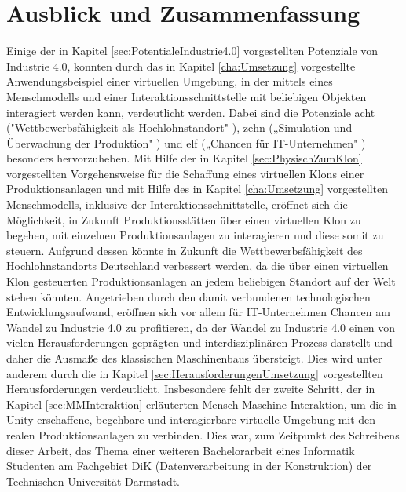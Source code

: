 \chapter{Ausblick und Zusammenfassung}\label{cha:AusblickUndFazit}

Einige der in Kapitel \ref{sec:PotentialeIndustrie4.0} vorgestellten Potenziale von Industrie 4.0, konnten durch das in Kapitel \ref{cha:Umsetzung} vorgestellte Anwendungsbeispiel einer virtuellen Umgebung, in der mittels eines Menschmodells und einer Interaktionsschnittstelle mit beliebigen Objekten interagiert werden kann, verdeutlicht werden. Dabei sind die Potenziale acht ("Wettbewerbsfähigkeit als Hochlohnstandort" \cite[S.20]{12}), zehn („Simulation und Überwachung der Produktion" \cite{6}) und elf („Chancen für IT-Unternehmen" \cite[S.7]{2}) besonders hervorzuheben.
\newline
Mit Hilfe der in Kapitel \ref{sec:PhysischZumKlon} vorgestellten Vorgehensweise für die Schaffung eines virtuellen Klons einer Produktionsanlagen und mit Hilfe des in Kapitel \ref{cha:Umsetzung} vorgestellten Menschmodells, inklusive der Interaktionsschnittstelle, eröffnet sich die Möglichkeit, in Zukunft Produktionsstätten über einen virtuellen Klon zu begehen, mit einzelnen Produktionsanlagen zu interagieren und diese somit zu steuern. Aufgrund dessen könnte in Zukunft die Wettbewerbsfähigkeit des Hochlohnstandorts Deutschland verbessert werden, da die über einen virtuellen Klon gesteuerten Produktionsanlagen an jedem beliebigen Standort auf der Welt stehen könnten.
Angetrieben durch den damit verbundenen technologischen Entwicklungsaufwand, eröffnen sich vor allem für IT-Unternehmen Chancen am Wandel zu Industrie 4.0 zu profitieren, da der Wandel zu Industrie 4.0 einen von vielen Herausforderungen geprägten und interdisziplinären Prozess darstellt und daher die Ausmaße des klassischen Maschinenbaus übersteigt. Dies wird unter anderem durch die in Kapitel \ref{sec:HerausforderungenUmsetzung} vorgestellten Herausforderungen verdeutlicht. Insbesondere fehlt der zweite Schritt, der in Kapitel \ref{sec:MMInteraktion} erläuterten Mensch-Maschine Interaktion, um die in Unity erschaffene, begehbare und interagierbare virtuelle Umgebung mit den realen Produktionsanlagen zu verbinden. Dies war, zum Zeitpunkt des Schreibens dieser Arbeit, das Thema einer weiteren Bachelorarbeit eines Informatik Studenten am Fachgebiet DiK (Datenverarbeitung in der Konstruktion) der Technischen Universität Darmstadt.

